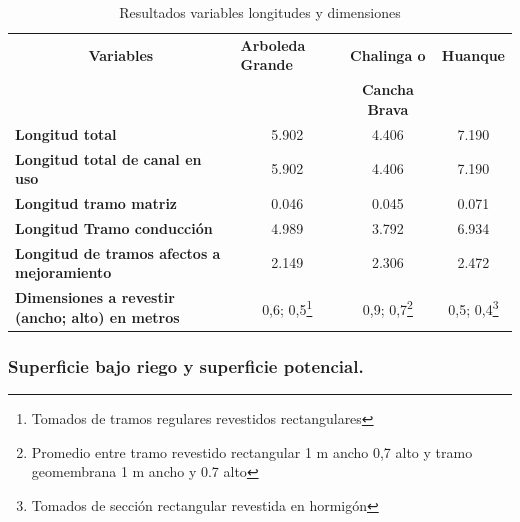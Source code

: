 \documentclass[]{article}
\let\rmarkdownfootnote\footnote%
\def\footnote{\protect\rmarkdownfootnote}
\begin{document}
\begin{longtable}{|l|ccc|}
\caption{Resultados variables longitudes y dimensiones}\\
\hline
\multicolumn{1}{|c|}{\textbf{Variables}}                 & \multicolumn{1}{l}{\textbf{Arboleda Grande}} & \multicolumn{1}{c}{\textbf{Chalinga o}} & \multicolumn{1}{l|}{\textbf{Huanque}} \\
 & & \multicolumn{1}{c}{\textbf{Cancha Brava}} &  \\ \hline
\textbf{Longitud total}                                  & 5.902                                        & 4.406                                                & 7.190                                 \\
\textbf{Longitud total de canal en uso}                  & 5.902                                        & 4.406                                                & 7.190                                 \\
\textbf{Longitud tramo matriz}                           & 0.046                                        & 0.045                                                & 0.071                                 \\
\textbf{Longitud Tramo conducción}                       & 4.989                                        & 3.792                                                & 6.934                                 \\
\textbf{Longitud de tramos afectos a mejoramiento}       & 2.149                                        & 2.306                                                & 2.472                                 \\
\textbf{Dimensiones a revestir  (ancho; alto) en metros} & 0,6; 0,5\footnote{Tomados de tramos regulares revestidos rectangulares}                                    & 0,9; 0,7\footnote{Promedio entre tramo revestido rectangular 1 m ancho 0,7 alto y tramo geomembrana 1 m ancho y 0.7 alto}                                          & 0,5; 0,4\footnote{Tomados de sección rectangular revestida en hormigón }\\ 
\hline
\end{longtable}

\subsubsection{Superficie bajo riego y superficie potencial.}
\end{document}
